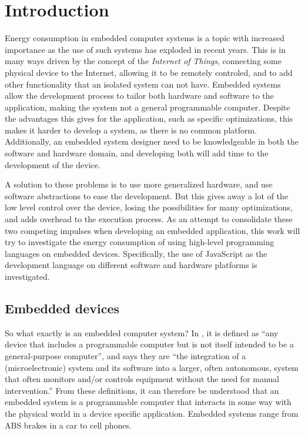 \chapter{Introduction}
\setcounter{page}{0}

Energy consumption in embedded computer systems is a topic with increased importance as the use of such systems has exploded in recent years. 
This is in many ways driven by the concept of the \emph{Internet of Things}, connecting some physical device to the Internet, allowing it to be remotely controled, and to add other functionality that an isolated system can not have.\citep{internetofthings}
Embedded systems allow the development process to tailor both hardware and software to the application, making the system not a general programmable computer.
Despite the advantages this gives for the application, such as specific optimizations, this makes it harder to develop a system, as there is no common platform.
Additionally, an embedded system designer need to be knowledgeable in both the software and hardware domain, and developing both will add time to the development of the device.

A solution to these problems is to use more generalized hardware, and use software abstractions to ease the development.
But this gives away a lot of the low level control over the device, losing the possibilities for many optimizations, and adds overhead to the execution process.
As an attempt to consolidate these two competing impulses when developing an embedded application, this work will try to investigate the energy consumption of using high-level programming languages on embedded devices.
Specifically, the use of JavaScript as the development language on different software and hardware platforms is investigated.

\section{Embedded devices}
So what exactly is an embedded computer system?
In \cite{computercomponents}, it is defined as ``any device that includes a programmable computer but is not itself intended to be a general-purpose computer'', and \cite{embeddsystems} says they are ``the integration of a (microelectronic) system and its software into a larger, often autonomous, system that often monitors and/or controls equipment without the need for manual intervention.''
From these definitions, it can therefore be understood that an embedded system is a programmable computer that interacts in some way with the physical world in a device specific application.
Embedded systems range from ABS brakes in a car to cell phones.

